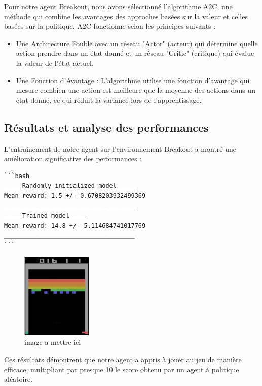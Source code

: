 \documentclass{article}
\begin{document}
Pour notre agent Breakout, nous avons sélectionné l'algorithme A2C, une méthode qui combine les avantages des approches basées sur la valeur et celles basées sur la politique. A2C fonctionne selon les principes suivants :
\begin{itemize} 
    \item Une Architecture Fouble avec un réseau "Actor" (acteur) qui détermine quelle action prendre dans un état donné et un réseau "Critic" (critique) qui évalue la valeur de l'état actuel.
    \item Une Fonction d'Avantage : L'algorithme utilise une fonction d'avantage qui mesure combien une action est meilleure que la moyenne des actions dans un état donné, ce qui réduit la variance lors de l'apprentissage.
\end{itemize}

\subsection{Résultats et analyse des performances}

\quad L'entraînement de notre agent sur l'environnement Breakout a montré une amélioration significative des performances :
\begin{verbatim}
```bash
_____Randomly initialized model_____
Mean reward: 1.5 +/- 0.6708203932499369
____________________________________
_____Trained model_____
Mean reward: 14.8 +/- 5.114684741017769
____________________________________
```
\end{verbatim}

\clearpage

\begin{figure}[ht]
    \centering
    \includegraphics[width=0.3\textwidth]{6.png}
    \caption{image a mettre ici}
\end{figure}

Ces résultats démontrent que notre agent a appris à jouer au jeu de manière efficace, multipliant par presque 10 le score obtenu par un agent à politique aléatoire.
\end{document}
